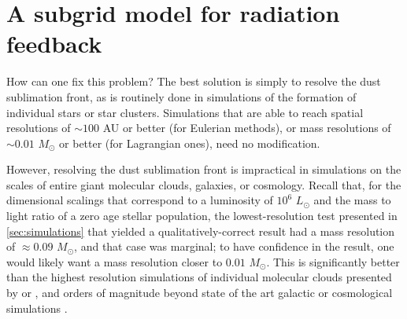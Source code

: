 \documentclass[useAMS,usenatbib]{mn2e}
\begin{document}
\section{A subgrid model for radiation feedback}
\label{sec:subgrid_model}

How can one fix this problem? The best solution is simply to resolve the dust sublimation front, as is routinely done in simulations of the formation of individual stars or star clusters. Simulations that are able to reach spatial resolutions of $\sim 100$ AU or better (for Eulerian methods), or mass resolutions of $\sim 0.01$ $M_\odot$ or better (for Lagrangian ones), need no modification.

However, resolving the dust sublimation front is impractical in simulations on the scales of entire giant molecular clouds, galaxies, or cosmology. Recall that, for the dimensional scalings that correspond to a luminosity of $10^6$ $L_\odot$ and the mass to light ratio of a zero age stellar population, the lowest-resolution test presented in \autoref{sec:simulations} that yielded a qualitatively-correct result had a mass resolution of $\approx 0.09$ $M_\odot$, and that case was marginal; to have confidence in the result, one would likely want a mass resolution closer to $0.01$ $M_\odot$. This is significantly better than the highest resolution simulations of individual molecular clouds presented by \citet{grudic18a} or \citet{kim18a}, and orders of magnitude beyond state of the art galactic or cosmological simulations \citep[e.g.,][]{hopkins11a, agertz13a, hopkins18b, kannan18a}.
\end{document}
